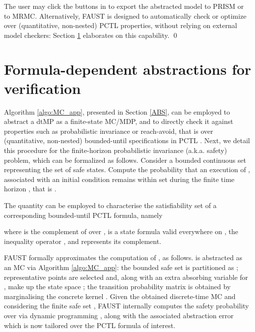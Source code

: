 \documentclass{llncs}
\newcommand*\circledb[1]{\tikz[baseline=(char.base)]{\node[shape=circle,draw,inner sep=0.2pt] (char) {#1};}}
\newcommand{\software}{\textsf{FAUST}\xspace}
\begin{document}
The user may click the buttons in \circledb{11} to export the abstracted model to PRISM or to MRMC. 
Alternatively, \software is designed to automatically check or optimize over (quantitative, non-nested) PCTL properties, 
without relying on external model checkers: Section \ref{PCTL} elaborates on this capability. 
\qed

\vspace{-0.1in}
\section{Formula-dependent abstractions for verification}
\label{PCTL}

Algorithm \ref{algo:MC_app}, presented in Section \ref{ABS}, 
can be employed to abstract a dtMP as a finite-state MC/MDP, 
and to directly check it against properties such as probabilistic invariance or reach-avoid, 
that is over (quantitative, non-nested) bounded-until specifications in PCTL \cite{HJ94}. 
Next, we detail this procedure for the finite-horizon probabilistic invariance (a.k.a. safety) problem, 
which can be formalized as follows. 
Consider a bounded continuous set  representing the set of safe states.
Compute the probability that an execution of , 
associated with an initial condition  
remains within set  during the finite time horizon , that is
.

The quantity  can be employed to characterise the satisfiability set of a corresponding bounded-until PCTL formula, namely
\vspace{-0.075in}

where 
 is the complement of  over , 
 is a state formula valid everywhere on , 
the inequality operator , 
and  represents its complement.

\software formally approximates the computation of , as follows.  
 is abstracted as an MC  via Algorithm \ref{algo:MC_app}: 
the bounded safe set   is partitioned as ; 
representative points  are selected and, along with an extra absorbing variable  for , make up the state space ; 
the transition probability matrix  is obtained by marginalising the concrete kernel . 
Given the obtained discrete-time MC  and considering the finite safe set , 
\software internally computes the safety probability over  via dynamic programming \cite{APKL10}, 
along with the associated abstraction error which is now tailored over the PCTL formula of interest.
\end{document}
